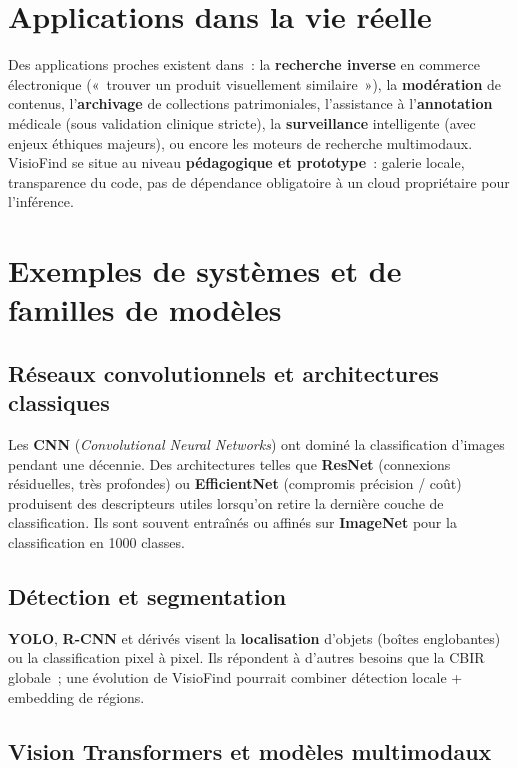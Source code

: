 \documentclass[11pt,a4paper,openany]{report}
\begin{document}
\section{Applications dans la vie réelle}

Des applications proches existent dans~: la \textbf{recherche inverse} en commerce électronique («~trouver un produit visuellement similaire~»), la \textbf{modération} de contenus, l'\textbf{archivage} de collections patrimoniales, l'assistance à l'\textbf{annotation} médicale (sous validation clinique stricte), la \textbf{surveillance} intelligente (avec enjeux éthiques majeurs), ou encore les moteurs de recherche multimodaux. VisioFind se situe au niveau \textbf{pédagogique et prototype}~: galerie locale, transparence du code, pas de dépendance obligatoire à un cloud propriétaire pour l'inférence.

\section{Exemples de systèmes et de familles de modèles}

\subsection{Réseaux convolutionnels et architectures classiques}

Les \textbf{CNN} (\emph{Convolutional Neural Networks}) ont dominé la classification d'images pendant une décennie. Des architectures telles que \textbf{ResNet} (connexions résiduelles, très profondes) ou \textbf{EfficientNet} (compromis précision / coût) produisent des descripteurs utiles lorsqu'on retire la dernière couche de classification. Ils sont souvent entraînés ou affinés sur \textbf{ImageNet} pour la classification en 1000 classes.

\subsection{Détection et segmentation}

\textbf{YOLO}, \textbf{R-CNN} et dérivés visent la \textbf{localisation} d'objets (boîtes englobantes) ou la classification pixel à pixel. Ils répondent à d'autres besoins que la CBIR globale~; une évolution de VisioFind pourrait combiner détection locale + embedding de régions.

\subsection{Vision Transformers et modèles multimodaux}
\end{document}
